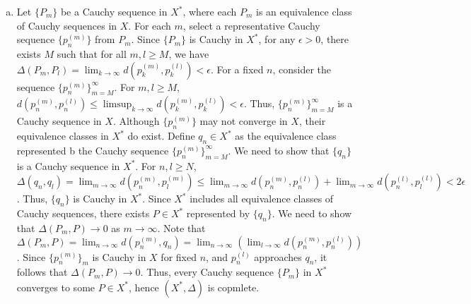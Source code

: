\documentclass[11pt]{article}
\begin{document}
\begin{exercise}{24}
\begin{enumerate} [(a)]
\begin{proof}
            We now prove that $\Delta$ is a metric on $X^*$.
            \begin{itemize}
                \item Non-negativity: $\Delta (P, Q) = \lim_{n \to \infty} d(p_n, q_n) \ge 0$ holds because $d(p_n, q_n) \ge 0$ for all $n$. 
                \item If $\Delta (P, Q) = 0$ then $P = Q$: If $\Delta (P, Q) = 0$, then $\lim_{n \to \infty} d(p_n, q_n) = 0$. By definition, $p_n \sim q_n$ which implies $P = Q$. We also show that if $P = Q$ then $\Delta (P, Q) = 0$: Since $P = Q$, $p_n \sim q_n$ which implies $\lim_{n \to \infty} d(p_n, q_n) = 0$. 
                \item Symmetry: $\Delta (P, Q) = \lim_{n \to \infty} d(p_n, q_n) = \lim_{n \to \infty} d(q_n, p_n) = \Delta (Q, P)$.
                \item Triangle Inequality: We want to show that for any $P, Q, R \in X^*$, $\Delta (P, R) \le \Delta (P, Q) + \Delta (Q, R)$. By the triangle inequality in $X$, we have $d(p_n, r_n) \le d(p_n, q_n) + d(q_n, r_n)$. Taking limits on both sides, $\lim_{n \to \infty} d(p_n, r_n) \le \lim_{n \to \infty} d(p_n, q_n) + \lim_{n \to \infty} d(q_n, r_n)$. By substituting definitions, we get what we wanted to show, $\Delta (P, R) \le \Delta (P, Q) + \Delta (Q, R)$.
            \end{itemize}
        \end{proof}
        \item Let $\{ P_m \}$ be a Cauchy sequence in $X^*$, where each $P_m$ is an equivalence class of Cauchy sequences in $X$. For each $m$, select a representative Cauchy sequence $\{ p_n^{(m)} \}$ from $P_m$. Since $\{ P_m \}$ is Cauchy in $X^*$, for any $\epsilon > 0$, there exists $M$ such that for all $m, l \ge M$,  we have $\Delta (P_m, P_l) = \lim_{k \to \infty} d(p_k^{(m)}, p_k^{(l)} ) < \epsilon$. For a fixed $n$, consider the sequence $\{ p_n^{(m)} \}_{m = M}^\infty$. For $m, l \ge M$, $d(p_n^{(m)}, p_n^{(l)}) \le \limsup_{k \to \infty} d(p_k^{(m)}, p_k^{(l)}) < \epsilon$. Thus, $\{ p_n^{(m)} \}_{m = M}^\infty$ is a Cauchy sequence in $X$. Although $\{ p_n^{(m)} \}$ may not converge in $X$, their equivalence classes in $X^*$ do exist. Define $q_n \in X^*$ as the equivalence class represented b the Cauchy sequence $\{ p_n^{(m)} \}_{m = M}^\infty$. We need to show that $\{ q_n \} $ is a Cauchy sequence in $X^*$. For $n, l \ge N$, $\Delta (q_n, q_l) = \lim_{m \to \infty} d(p_n^{(m)}, p_l^{(m)} ) \le \lim_{m \to \infty} d(p_n^{(m)}, p_n^{(l)}) + \lim_{m \to \infty} d(p_n^{(l)}, p_l^{(l)}) < 2 \epsilon$. Thus, $\{ q_n \}$ is Cauchy in $X^*$. Since $X^*$ includes all equivalence classes of Cauchy sequences, there exists $P \in X^*$ represented by $\{ q_n \}$. We need to show that $\Delta (P_m, P) \to 0$ as $m \to \infty$. Note that $\Delta (P_m, P) = \lim_{n \to \infty} d(p_n^{(m)}, q_n) = \lim_{n \to \infty} (\lim_{l \to \infty} d(p_n^{(m)}, p_n^{(l)}) )$. Since $\{ p_n^{(m)} \}_m$ is Cauchy in $X$ for fixed $n$, and $p_n^{(l)}$ approaches $q_n$, it follows that $\Delta (P_m, P) \to 0$. Thus, every Cauchy sequence $\{ P_m \}$ in $X^*$ converges to some $P \in X^*$, hence $(X^*, \Delta)$ is copmlete. 

\end{enumerate}
\end{exercise}
\end{document}
